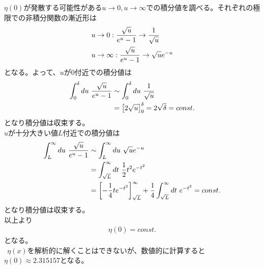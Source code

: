 \documentclass[dvipdfmx, 11pt, a4paper]{jsarticle}
\theoremstyle{definition}
\begin{document}
    $\eta(0)$が発散する可能性がある$u \rightarrow 0,u \rightarrow \infty$での積分値を調べる。それぞれの極限での非積分関数の漸近形は
    \begin{align}
        &u \rightarrow 0: \frac{\sqrt{u}}{e^{u} - 1} \rightarrow \frac{1}{\sqrt{u}} \notag \\
        &u \rightarrow \infty: \frac{\sqrt{u}}{e^{u} - 1} \rightarrow \sqrt{u} e^{-u} \notag
    \end{align}
    となる。よって、$u$が$0$付近での積分値は
    \begin{align}
        \int_0^{\delta} du\ \frac{\sqrt{u}}{e^{u} - 1} &\sim \int_0^{\delta} du\ \frac{1}{\sqrt{u}} \notag \\
        &= \left[ 2\sqrt{u} \right]_0^{\delta} = 2\sqrt{\delta} = const.
    \end{align}
    となり積分値は収束する。\\
    $u$が十分大きい値$L$付近での積分値は
    \begin{align}
        \int_L^{\infty} du\ \frac{\sqrt{u}}{e^{u} - 1} &\sim \int_L^{\infty} du\ \sqrt{u} e^{-u} \notag \\
        &= \int_{\sqrt{L}}^{\infty} dt\ \frac{1}{2} t^2 e^{-t^2} \notag \\
        &= \left[ -\frac{1}{4} t e^{-t^2} \right]_{\sqrt{L}}^{\infty} + \frac{1}{4} \int_{\sqrt{L}}^{\infty} dt\ e^{-t^2} = const.
    \end{align}
    となり積分値は収束する。\\
    以上より
    \begin{align}
        \eta (0) = const.
    \end{align}
    となる。\\
    $\ \ $$\eta (x)$を解析的に解くことはできないが、数値的に計算すると$\eta (0) \approx 2.315157$となる。
\end{document}
